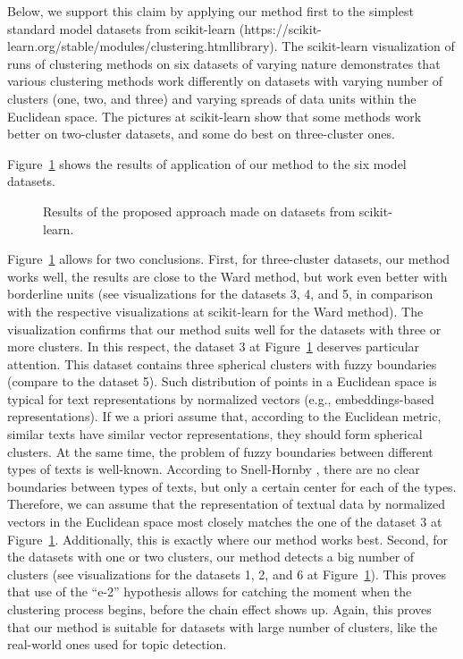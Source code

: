 Below, we support this claim by applying our method first to the simplest standard model datasets from scikit-learn (https://scikit-learn.org/stable/modules/clustering.htmllibrary). The scikit-learn visualization of runs of clustering methods on six datasets of varying nature demonstrates that various clustering methods work differently on datasets with varying number of clusters (one, two, and three) and varying spreads of data units within the Euclidean space. The pictures at scikit-learn show that some methods work better on two-cluster datasets, and some do best on three-cluster ones.

Figure~\cref{fig:scikitLearnResults} shows the results of application of our method to the six model datasets.

\begin{figure}[ht]
	\caption{Results of the proposed approach made on datasets from scikit-learn.}\label{fig:scikitLearnResults}
\end{figure}

Figure~\cref{fig:scikitLearnResults} allows for two conclusions. First, for three-cluster datasets, our method works well, the results are close to the Ward method, but work even better with borderline units (see visualizations for the datasets 3, 4, and 5, in comparison with the respective visualizations at scikit-learn for the Ward method). The visualization confirms that our method suits well for the datasets with three or more clusters. In this respect, the dataset 3 at Figure~\cref{fig:scikitLearnResults} deserves particular attention. This dataset contains three spherical clusters with fuzzy boundaries (compare to the dataset 5). Such distribution of points in a Euclidean space is typical for text representations by normalized vectors (e.g., embeddings-based representations). If we a priori assume that, according to the Euclidean metric, similar texts have similar vector representations, they should form spherical clusters. At the same time, the problem of fuzzy boundaries between different types of texts is well-known. According to Snell-Hornby \cite{SnellHornby}, there are no clear boundaries between types of texts, but only a certain center for each of the types. Therefore, we can assume that the representation of textual data by normalized vectors in the Euclidean space most closely matches the one of the dataset 3 at Figure~\cref{fig:scikitLearnResults}. Additionally, this is exactly where our method works best. Second, for the datasets with one or two clusters, our method detects a big number of clusters (see visualizations for the datasets 1, 2, and 6 at Figure~\cref{fig:scikitLearnResults}). This proves that use of the “e-2” hypothesis allows for catching the moment when the clustering process begins, before the chain effect shows up. Again, this proves that our method is suitable for datasets with large number of clusters, like the real-world ones used for topic detection.

